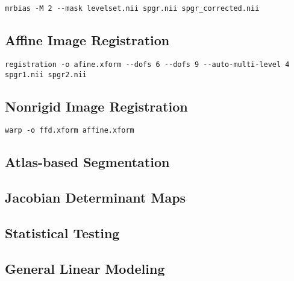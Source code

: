 \documentclass{InsightArticle}
\begin{document}
\begin{verbatim}
mrbias -M 2 --mask levelset.nii spgr.nii spgr_corrected.nii
\end{verbatim}

\subsection{Affine Image Registration}


\begin{verbatim}
registration -o afine.xform --dofs 6 --dofs 9 --auto-multi-level 4 spgr1.nii spgr2.nii
\end{verbatim}

\subsection{Nonrigid Image Registration}

\cite{RuecSonoHaye:1999} \cite{RohlMaur:2003}

\begin{verbatim}
warp -o ffd.xform affine.xform
\end{verbatim}

\subsection{Atlas-based Segmentation}

\subsection{Jacobian Determinant Maps}

\subsection{Statistical Testing}

\subsection{General Linear Modeling}


%
%



\end{document}
